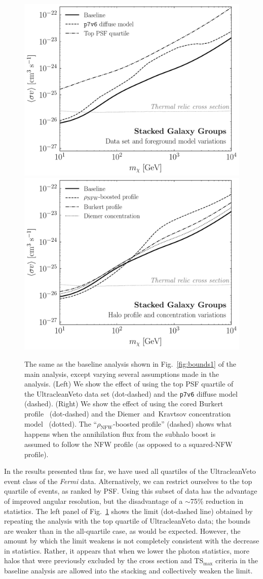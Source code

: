 \begin{figure}[t]
  \centering
  \includegraphics[width=.45\textwidth]{ch-clusters/plots/systematics_dataset.pdf}
  \includegraphics[width=.45\textwidth]{ch-clusters/plots/systematics_profile_conc.pdf}
  \caption{The same as the baseline analysis shown in Fig.~\ref{fig:bounds1} of the main analysis, except varying several assumptions made in the analysis.  (Left) We show the effect of using the top PSF quartile of the UltracleanVeto data set (dot-dashed) and the \texttt{p7v6} diffuse model (dashed).  (Right) We show the effect of using the cored Burkert profile~\cite{Burkert:1995yz} (dot-dashed) and the Diemer~and~Kravtsov concentration model~\cite{Diemer:2014gba} (dotted).  The ``$\rho_\text{NFW}$-boosted profile'' (dashed) shows what happens when the annihilation flux from the subhalo boost is assumed to follow the NFW profile (as opposed to a squared-NFW profile). }
  \label{fig:systematics_data_profile}
\end{figure}

In the results presented thus far, we have used all quartiles of the UltracleanVeto event class of the {\it Fermi} data.  Alternatively, we can restrict ourselves to the top quartile of events, as ranked by PSF.  Using this subset of data has the advantage of improved angular resolution, but the disadvantage of a $\sim$75\% reduction in statistics.  The  left panel of Fig.~\ref{fig:systematics_data_profile} shows the limit (dot-dashed line) obtained by repeating the analysis with the top quartile of UltracleanVeto data; the bounds are weaker than in the all-quartile case, as would be expected.  However, the amount by which the limit weakens is not completely consistent with the decrease in statistics.  Rather, it appears that when we lower the photon statistics, more halos that were previously excluded by the cross section and TS$_\text{max}$ criteria in the baseline analysis are allowed into the stacking and collectively weaken the limit.

